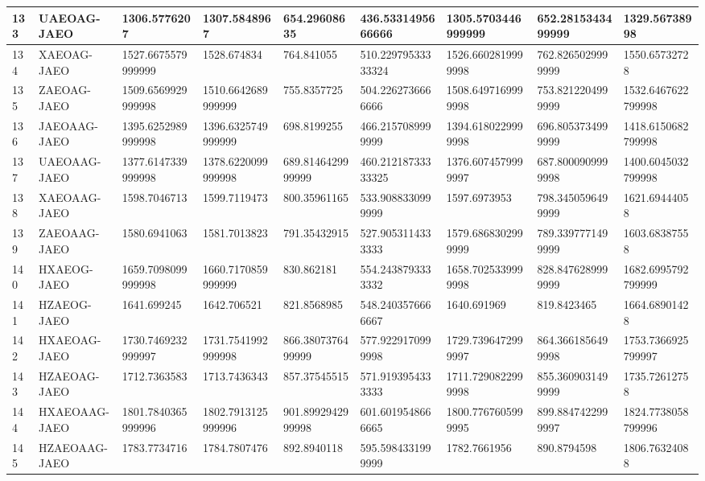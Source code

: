 {\begin{longtable}{|l|l|l|l|l|l|l|l|l|}
        133 & UAEOAG-JAEO & 1306.5776207 & 1307.5848967 & 654.29608635 & 436.5331495666666 & 1305.5703446999999 & 652.2815343499999 & 1329.56738998 \\ \hline
        134 & XAEOAG-JAEO & 1527.6675579999999 & 1528.674834 & 764.841055 & 510.22979533333324 & 1526.6602819999998 & 762.8265029999999 & 1550.65732728 \\ \hline
        135 & ZAEOAG-JAEO & 1509.6569929999998 & 1510.6642689999999 & 755.8357725 & 504.2262736666666 & 1508.6497169999998 & 753.8212204999999 & 1532.6467622799998 \\ \hline
        136 & JAEOAAG-JAEO & 1395.6252989999998 & 1396.6325749999999 & 698.8199255 & 466.2157089999999 & 1394.6180229999998 & 696.8053734999999 & 1418.6150682799998 \\ \hline
        137 & UAEOAAG-JAEO & 1377.6147339999998 & 1378.6220099999998 & 689.8146429999999 & 460.21218733333325 & 1376.6074579999997 & 687.8000909999998 & 1400.6045032799998 \\ \hline
        138 & XAEOAAG-JAEO & 1598.7046713 & 1599.7119473 & 800.35961165 & 533.9088330999999 & 1597.6973953 & 798.3450596499999 & 1621.69444058 \\ \hline
        139 & ZAEOAAG-JAEO & 1580.6941063 & 1581.7013823 & 791.35432915 & 527.9053114333333 & 1579.6868302999999 & 789.3397771499999 & 1603.68387558 \\ \hline
        140 & HXAEOG-JAEO & 1659.7098099999998 & 1660.7170859999999 & 830.862181 & 554.2438793333332 & 1658.7025339999998 & 828.8476289999999 & 1682.6995792799999 \\ \hline
        141 & HZAEOG-JAEO & 1641.699245 & 1642.706521 & 821.8568985 & 548.2403576666667 & 1640.691969 & 819.8423465 & 1664.68901428 \\ \hline
        142 & HXAEOAG-JAEO & 1730.7469232999997 & 1731.7541992999998 & 866.3807376499999 & 577.9229170999998 & 1729.7396472999997 & 864.3661856499998 & 1753.7366925799997 \\ \hline
        143 & HZAEOAG-JAEO & 1712.7363583 & 1713.7436343 & 857.37545515 & 571.9193954333333 & 1711.7290822999998 & 855.3609031499999 & 1735.72612758 \\ \hline
        144 & HXAEOAAG-JAEO & 1801.7840365999996 & 1802.7913125999996 & 901.8992942999998 & 601.6019548666665 & 1800.7767605999995 & 899.8847422999997 & 1824.7738058799996 \\ \hline
        145 & HZAEOAAG-JAEO & 1783.7734716 & 1784.7807476 & 892.8940118 & 595.5984331999999 & 1782.7661956 & 890.8794598 & 1806.76324088 \\ \hline

\end{longtable}}
